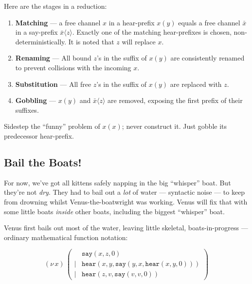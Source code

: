 \documentclass[10pt,oneside,x11names]{article}
\newcommand\napping    [0]{0}
\newcommand\whispering [2]{(\nu\,#1)\,{#2}}
\theoremstyle{definition}
\theoremstyle{warning}
\begin{document}
Here are the stages in a reduction:

\begin{enumerate}
\item \textbf{Matching} --- a free channel \(x\) in a hear-prefix
\(x(y)\) equals a free channel \(\bar{x}\) in a say-prefix
\(\bar{x}\langle{z}\rangle\). Exactly one of the matching
hear-prefixes is chosen, non-deterministically. It is noted
that \(z\) will replace \(x\).

\item \textbf{Renaming} --- All bound \(z\)'s in the suffix of
\(x(y)\) are consistently renamed to prevent collisions with
the incoming \(x\).

\item \textbf{Substitution} --- All free \(z\)'s in the suffix of
\(x(y)\) are replaced with \(z\).

\item \textbf{Gobbling} --- \(x(y)\) and \(\bar{x}\langle{z}\rangle\)
are removed, exposing the first prefix of their suffixes.
\end{enumerate}

Sidestep the ``funny'' problem of \(x(x)\); never construct it.
Just gobble its predecessor hear-prefix.

\subsection{Bail the Boats!}
\label{sec:orgc4469d7}

For now, we've got all kittens safely napping in the big
``whisper'' boat. But they're not \emph{dry}. They had to bail out a
\emph{lot} of water --- syntactic noise --- to keep from drowning
whilst Venus-the-boatwright was working. Venus will fix that
with some little boats \emph{inside} other boats, including the
biggest ``whisper'' boat.

Venus first bails out most of the water, leaving little skeletal,
boats-in-progress --- ordinary mathematical function notation:

\begin{equation}
\whispering{x}{\left(
\begin{array}{clll}
 {}     & \texttt{say} (x, z, \napping) \\
 \vert  & \texttt{hear}(x, y, \texttt{say}(y, x, \texttt{hear}(x, y, \napping))) \\
 \vert  & \texttt{hear}(z, v, \texttt{say}(v, v, \napping))
\end{array}\right)}
\end{equation}
\end{document}
